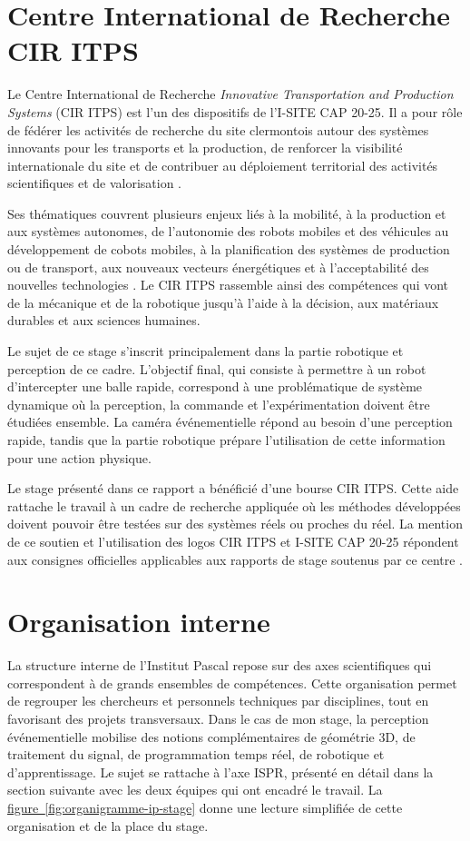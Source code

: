 \documentclass[a4paper,11pt]{report}
\newcommand{\figref}[1]{\hyperref[#1]{figure~\ref*{#1}}}
\begin{document}
\section{Centre International de Recherche CIR ITPS}

Le Centre International de Recherche \emph{Innovative Transportation and Production Systems} (CIR ITPS) est l'un des dispositifs de l'I-SITE CAP 20-25. Il a pour rôle de fédérer les activités de recherche du site clermontois autour des systèmes innovants pour les transports et la production, de renforcer la visibilité internationale du site et de contribuer au déploiement territorial des activités scientifiques et de valorisation \cite{cir-itps}.

Ses thématiques couvrent plusieurs enjeux liés à la mobilité, à la production et aux systèmes autonomes, de l'autonomie des robots mobiles et des véhicules au développement de cobots mobiles, à la planification des systèmes de production ou de transport, aux nouveaux vecteurs énergétiques et à l'acceptabilité des nouvelles technologies \cite{cir-itps}. Le CIR ITPS rassemble ainsi des compétences qui vont de la mécanique et de la robotique jusqu'à l'aide à la décision, aux matériaux durables et aux sciences humaines.

Le sujet de ce stage s'inscrit principalement dans la partie robotique et perception de ce cadre. L'objectif final, qui consiste à permettre à un robot d'intercepter une balle rapide, correspond à une problématique de système dynamique où la perception, la commande et l'expérimentation doivent être étudiées ensemble. La caméra événementielle répond au besoin d'une perception rapide, tandis que la partie robotique prépare l'utilisation de cette information pour une action physique.

Le stage présenté dans ce rapport a bénéficié d'une bourse CIR ITPS. Cette aide rattache le travail à un cadre de recherche appliquée où les méthodes développées doivent pouvoir être testées sur des systèmes réels ou proches du réel. La mention de ce soutien et l'utilisation des logos CIR ITPS et I-SITE CAP 20-25 répondent aux consignes officielles applicables aux rapports de stage soutenus par ce centre \cite{cir-itps-useful}.

\section{Organisation interne}

La structure interne de l'Institut Pascal repose sur des axes scientifiques qui correspondent à de grands ensembles de compétences. Cette organisation permet de regrouper les chercheurs et personnels techniques par disciplines, tout en favorisant des projets transversaux. Dans le cas de mon stage, la perception événementielle mobilise des notions complémentaires de géométrie 3D, de traitement du signal, de programmation temps réel, de robotique et d'apprentissage. Le sujet se rattache à l'axe ISPR, présenté en détail dans la section suivante avec les deux équipes qui ont encadré le travail. La \figref{fig:organigramme-ip-stage} donne une lecture simplifiée de cette organisation et de la place du stage.
\end{document}
